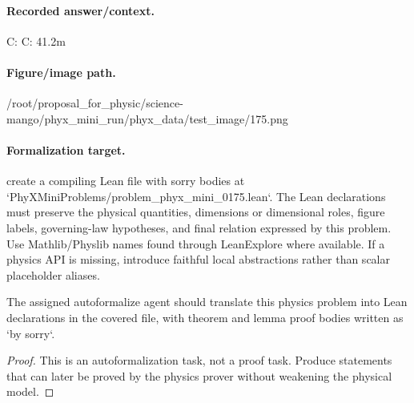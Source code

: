 \paragraph{Recorded answer/context.}
C: C: 41.2m

\paragraph{Figure/image path.}
/root/proposal\_for\_physic/science-mango/phyx\_mini\_run/phyx\_data/test\_image/175.png

\paragraph{Formalization target.}
create a compiling Lean file with sorry bodies at `PhyXMiniProblems/problem\_phyx\_mini\_0175.lean`. The Lean declarations must preserve the physical quantities, dimensions or dimensional roles, figure labels, governing-law hypotheses, and final relation expressed by this problem.
Use Mathlib/Physlib names found through LeanExplore where available. If a physics API is missing, introduce faithful local abstractions rather than scalar placeholder aliases.

\begin{theorem}
\label{thm:physics:phyx_mini_0175:target}
The assigned autoformalize agent should translate this physics problem into Lean declarations in the covered file, with theorem and lemma proof bodies written as `by sorry`.
\end{theorem}
\begin{proof}
This is an autoformalization task, not a proof task. Produce statements that can later be proved by the physics prover without weakening the physical model.
\end{proof}


